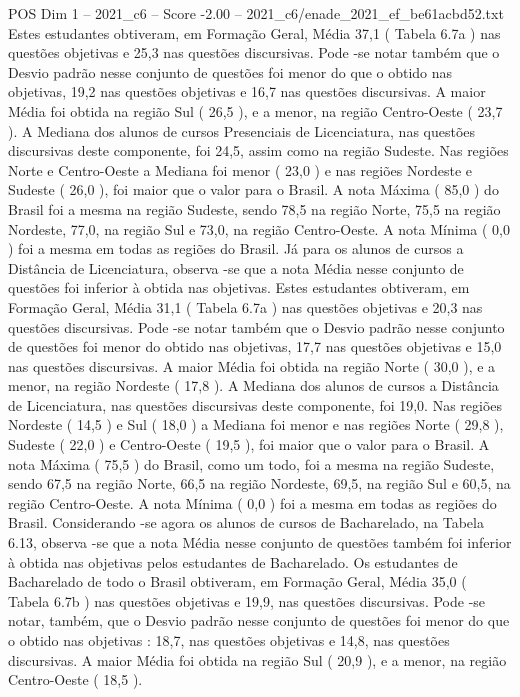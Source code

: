 \begin{textsample}{POS Dim 1 – 2021\_c6 – Score -2.00 – 2021\_c6/enade\_2021\_ef\_be61acbd52.txt}
Estes estudantes obtiveram, em Formação Geral, Média 37,1 ( Tabela 6.7a ) nas questões objetivas e 25,3 nas questões discursivas.
Pode -se notar também que o Desvio padrão nesse conjunto de questões foi menor do que o obtido nas objetivas, 19,2 nas questões objetivas e 16,7 nas questões discursivas.
A maior Média foi obtida na região Sul ( 26,5 ), e a menor, na região Centro-Oeste ( 23,7 ).
A Mediana dos alunos de cursos Presenciais de Licenciatura, nas questões discursivas deste componente, foi 24,5, assim como na região Sudeste.
Nas regiões Norte e Centro-Oeste a Mediana foi menor ( 23,0 ) e nas regiões Nordeste e Sudeste ( 26,0 ), foi maior que o valor para o Brasil.
A nota Máxima ( 85,0 ) do Brasil foi a mesma na região Sudeste, sendo 78,5 na região Norte, 75,5 na região Nordeste, 77,0, na região Sul e 73,0, na região Centro-Oeste.
A nota Mínima ( 0,0 ) foi a mesma em todas as regiões do Brasil.
Já para os alunos de cursos a Distância de Licenciatura, observa -se que a nota Média nesse conjunto de questões foi inferior à obtida nas objetivas.
Estes estudantes obtiveram, em Formação Geral, Média 31,1 ( Tabela 6.7a ) nas questões objetivas e 20,3 nas questões discursivas.
Pode -se notar também que o Desvio padrão nesse conjunto de questões foi menor do obtido nas objetivas, 17,7 nas questões objetivas e 15,0 nas questões discursivas.
A maior Média foi obtida na região Norte ( 30,0 ), e a menor, na região Nordeste ( 17,8 ).
A Mediana dos alunos de cursos a Distância de Licenciatura, nas questões discursivas deste componente, foi 19,0.
Nas regiões Nordeste ( 14,5 ) e Sul ( 18,0 ) a Mediana foi menor e nas regiões Norte ( 29,8 ), Sudeste ( 22,0 ) e Centro-Oeste ( 19,5 ), foi maior que o valor para o Brasil.
A nota Máxima ( 75,5 ) do Brasil, como um todo, foi a mesma na região Sudeste, sendo 67,5 na região Norte, 66,5 na região Nordeste, 69,5, na região Sul e 60,5, na região Centro-Oeste.
A nota Mínima ( 0,0 ) foi a mesma em todas as regiões do Brasil.
Considerando -se agora os alunos de cursos de Bacharelado, na Tabela 6.13, observa -se que a nota Média nesse conjunto de questões também foi inferior à obtida nas objetivas pelos estudantes de Bacharelado.
Os estudantes de Bacharelado de todo o Brasil obtiveram, em Formação Geral, Média 35,0 ( Tabela 6.7b ) nas questões objetivas e 19,9, nas questões discursivas.
Pode -se notar, também, que o Desvio padrão nesse conjunto de questões foi menor do que o obtido nas objetivas : 18,7, nas questões objetivas e 14,8, nas questões discursivas.
A maior Média foi obtida na região Sul ( 20,9 ), e a menor, na região Centro-Oeste ( 18,5 ).

\end{textsample}
